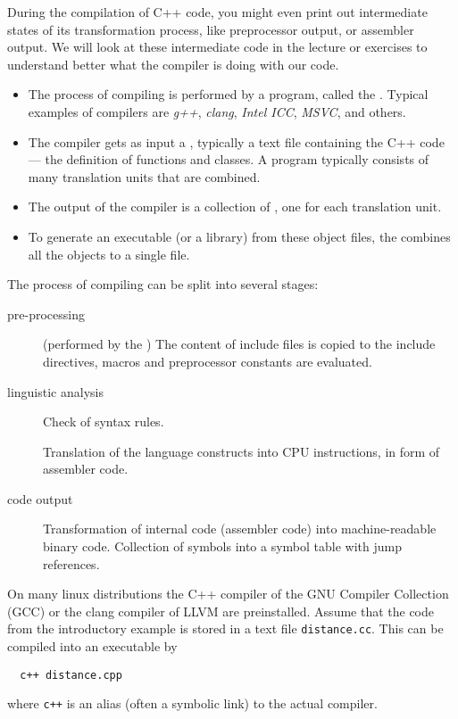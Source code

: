 \begin{rem}
  During the compilation of C++ code, you might even print out intermediate states of its transformation process, like preprocessor output, or assembler output. We will look at these intermediate code in the lecture or exercises to understand better what the compiler is doing with our code.
\end{rem}

\begin{itemize}
  \item The process of compiling is performed by a program, called the . Typical examples of compilers are \emph{g++}, \emph{clang}, \emph{Intel ICC}, \emph{MSVC}, and others.

  \item The compiler gets as input a , typically a text file containing the C++ code --- the definition of functions and classes. A program typically consists of many translation units that are combined.

  \item The output of the compiler is a collection of , one for each translation unit.

  \item To generate an executable (or a library) from these object files, the  combines all the objects to a single file.
\end{itemize}

The process of compiling can be split into several stages:
\begin{description}
  \item[pre-processing] (performed by the ) The content of include files is copied to the include directives, macros and preprocessor constants are evaluated.

  \item[linguistic analysis] Check of syntax rules.

  \item[] Translation of the language constructs into CPU instructions, \eg in form of assembler code.

  \item[code output] Transformation of internal code (assembler code) into machine-readable binary code. Collection of symbols into a symbol table with jump references.
\end{description}

On many linux distributions the C++ compiler of the GNU Compiler Collection (GCC) or the clang compiler of LLVM are preinstalled. Assume that the code from the introductory example is stored in a text file \texttt{distance.cc}. This can be compiled into an executable by
%
\begin{verbatim}
  c++ distance.cpp
\end{verbatim}
%
where \texttt{c++} is an alias (often a symbolic link) to the actual compiler.

